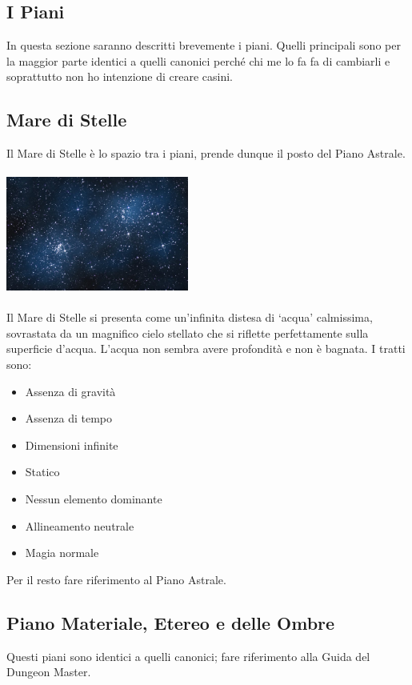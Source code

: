 \documentclass[10pt, a4paper]{report}
\begin{document}
\begin{multicols}{2}
\section{I Piani}
In questa sezione saranno descritti brevemente i piani. Quelli principali sono per la maggior parte identici a quelli canonici perché chi me lo fa fa di cambiarli e soprattutto non ho intenzione di creare casini.
\subsection*{Mare di Stelle}
Il Mare di Stelle è lo spazio tra i piani, prende dunque il posto del Piano Astrale.\\
\\
\includegraphics[width=6cm]{stars.jpeg}\\
\\
Il Mare di Stelle si presenta come un'infinita distesa di \enquote*{acqua} calmissima, sovrastata da un magnifico cielo stellato che si riflette perfettamente sulla superficie d'acqua. L'acqua non sembra avere profondità e non è bagnata. I tratti sono:
\begin{itemize}
	\item Assenza di gravità
	\item Assenza di tempo
	\item Dimensioni infinite
	\item Statico
	\item Nessun elemento dominante
	\item Allineamento neutrale
	\item Magia normale
\end{itemize}
Per il resto fare riferimento al Piano Astrale.
\subsection*{Piano Materiale, Etereo e delle Ombre}
Questi piani sono identici a quelli canonici; fare riferimento alla Guida del Dungeon Master.

\end{multicols}
\end{document}
